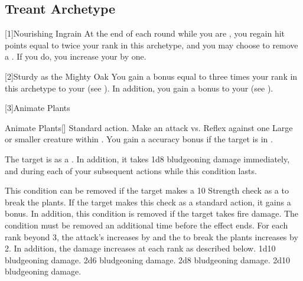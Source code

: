 \subsection{Treant Archetype}

[1]{Nourishing Ingrain} At the end of each round while you are , you regain hit points equal to twice your rank in this archetype, and you may choose to remove a .
If you do, you increase your  by one.

[2]{Sturdy as the Mighty Oak} You gain a bonus equal to three times your rank in this archetype to your  (see ).
In addition, you gain a  bonus to your  (see ).

[3]{Animate Plants}
\begin{activeability}{Animate Plants}[]
	\abilityusagetime Standard action.
	\rankline
	Make an attack vs. Reflex against one Large or smaller  creature within \medrange.
	You gain a  accuracy bonus if the target is in .

	\hit The target is \slowed as a .
	In addition, it takes 1d8 bludgeoning damage immediately, and during each of your subsequent actions while this condition lasts.

	This condition can be removed if the target makes a  10 Strength check as a  to break the plants.
	If the target makes this check as a standard action, it gains a  bonus.
	In addition, this condition is removed if the target takes fire damage.
	\crit The condition must be removed an additional time before the effect ends.
	\rankline
	For each rank beyond 3, the attack's  increases by  and the  to break the plants increases by 2.
	In addition, the damage increases at each rank as described below.
	 1d10 bludgeoning damage.
	 2d6 bludgeoning damage.
	 2d8 bludgeoning damage.
	 2d10 bludgeoning damage.
\end{activeability}

